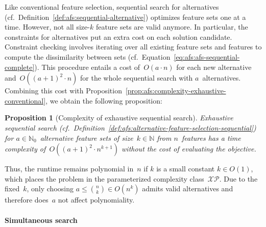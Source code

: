 \documentclass{article}
\newtheorem{proposition}{Proposition}
\theoremstyle{definition}
\begin{document}
Like conventional feature selection, sequential search for alternatives (cf.~Definition~\ref{def:afs:sequential-alternative}) optimizes feature sets one at a time.
However, not all size-$k$ feature sets are valid anymore.
In particular, the constraints for alternatives put an extra cost on each solution candidate.
Constraint checking involves iterating over all existing feature sets and features to compute the dissimilarity between sets (cf.~Equation~\ref{eq:afs:afs-sequential-complete}).
This procedure entails a cost of~$O(a \cdot n)$ for each new alternative and~$O((a+1)^2 \cdot n)$ for the whole sequential search with $a$~alternatives.
Combining this cost with Proposition~\ref{prop:afs:complexity-exhaustive-conventional}, we obtain the following proposition:
%
\begin{proposition}[Complexity of exhaustive sequential search]
	Exhaustive sequential search (cf.~Definition~\ref{def:afs:alternative-feature-selection-sequential}) for $a \in \mathbb{N}_0$~alternative feature sets of size~$k \in \mathbb{N}$ from $n$~features has a time complexity of~$O((a+1)^2 \cdot n^{k+1})$ without the cost of evaluating the objective.
	\label{prop:afs:complexity-exhaustive-sequential}
\end{proposition}
%
Thus, the runtime remains polynomial in~$n$ if $k$ is a small constant $k \in O(1)$, which places the problem in the parameterized complexity class~$\mathcal{XP}$.
Due to the fixed~$k$, only choosing $a \leq \binom{n}{k} \in O(n^k)$ admits valid alternatives and therefore does~$a$ not affect polynomiality.

\paragraph{Simultaneous search}
\end{document}
